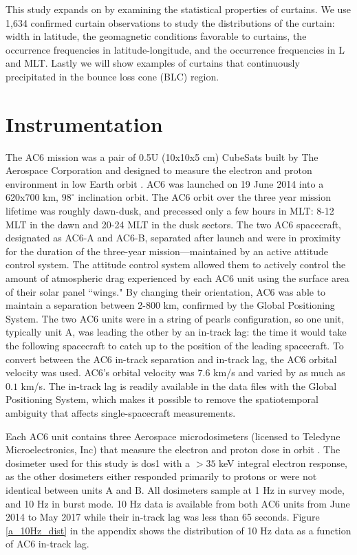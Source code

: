 \documentclass[draft]{agujournal2019}
\begin{document}
This study expands on  by examining the statistical properties of curtains. We use 1,634 confirmed curtain observations to study the distributions of the curtain: width in latitude, the geomagnetic conditions favorable to curtains, the occurrence frequencies in latitude-longitude, and the occurrence frequencies in L and MLT. Lastly we will show examples of curtains that continuously precipitated in the bounce loss cone (BLC) region.

\section{Instrumentation} \label{instrumentation}
The AC6 mission was a pair of 0.5U (10x10x5 cm) CubeSats built by The Aerospace Corporation and designed to measure the electron and proton environment in low Earth orbit \cite{O'Brien2016, O'Brien2019}. AC6 was launched on 19 June 2014 into a 620x700 km, $98^\circ$ inclination orbit. The AC6 orbit over the three year mission lifetime was roughly dawn-dusk, and precessed only a few hours in MLT: 8-12 MLT in the dawn and 20-24 MLT in the dusk sectors. The two AC6 spacecraft, designated as AC6-A and AC6-B, separated after launch and were in proximity for the duration of the three-year mission---maintained by an active attitude control system. The attitude control system allowed them to actively control the amount of atmospheric drag experienced by each AC6 unit using the surface area of their solar panel ``wings." By changing their orientation, AC6 was able to maintain a separation between 2-800 km, confirmed by the Global Positioning System. The two AC6 units were in a string of pearls configuration, so one unit, typically unit A, was leading the other by an in-track lag: the time it would take the following spacecraft to catch up to the position of the leading spacecraft. To convert between the AC6 in-track separation and in-track lag, the AC6 orbital velocity was used. AC6's orbital velocity was $7.6$ km/s and varied by as much as $0.1$ km/s. The in-track lag is readily available in the data files with the Global Positioning System, which makes it possible to remove the spatiotemporal ambiguity that affects single-spacecraft measurements.

Each AC6 unit contains three Aerospace microdosimeters (licensed to Teledyne Microelectronics, Inc) that measure the electron and proton dose in orbit \cite{O'Brien2016}. The dosimeter used for this study is dos1 with a $> 35$ keV integral electron response, as the other dosimeters either responded primarily to protons or were not identical between units A and B. All dosimeters sample at 1 Hz in survey mode, and 10 Hz in burst mode. 10 Hz data is available from both AC6 units from June 2014 to May 2017 while their in-track lag was less than 65 seconds. Figure \ref{a_10Hz_dist} in the appendix shows the distribution of 10 Hz data as a function of AC6 in-track lag.
\end{document}
